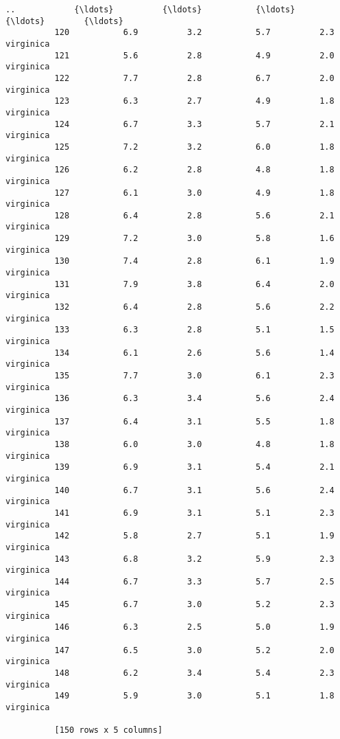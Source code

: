 \documentclass[11pt]{article}
\begin{document}
\begin{Verbatim}[commandchars=\\\{\}]
          ..            {\ldots}          {\ldots}           {\ldots}          {\ldots}        {\ldots}
          120           6.9          3.2           5.7          2.3  virginica
          121           5.6          2.8           4.9          2.0  virginica
          122           7.7          2.8           6.7          2.0  virginica
          123           6.3          2.7           4.9          1.8  virginica
          124           6.7          3.3           5.7          2.1  virginica
          125           7.2          3.2           6.0          1.8  virginica
          126           6.2          2.8           4.8          1.8  virginica
          127           6.1          3.0           4.9          1.8  virginica
          128           6.4          2.8           5.6          2.1  virginica
          129           7.2          3.0           5.8          1.6  virginica
          130           7.4          2.8           6.1          1.9  virginica
          131           7.9          3.8           6.4          2.0  virginica
          132           6.4          2.8           5.6          2.2  virginica
          133           6.3          2.8           5.1          1.5  virginica
          134           6.1          2.6           5.6          1.4  virginica
          135           7.7          3.0           6.1          2.3  virginica
          136           6.3          3.4           5.6          2.4  virginica
          137           6.4          3.1           5.5          1.8  virginica
          138           6.0          3.0           4.8          1.8  virginica
          139           6.9          3.1           5.4          2.1  virginica
          140           6.7          3.1           5.6          2.4  virginica
          141           6.9          3.1           5.1          2.3  virginica
          142           5.8          2.7           5.1          1.9  virginica
          143           6.8          3.2           5.9          2.3  virginica
          144           6.7          3.3           5.7          2.5  virginica
          145           6.7          3.0           5.2          2.3  virginica
          146           6.3          2.5           5.0          1.9  virginica
          147           6.5          3.0           5.2          2.0  virginica
          148           6.2          3.4           5.4          2.3  virginica
          149           5.9          3.0           5.1          1.8  virginica
          
          [150 rows x 5 columns]
\end{Verbatim}
            
\end{document}

